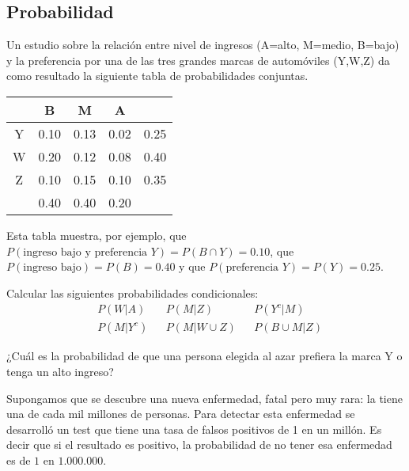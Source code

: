 \documentclass[a4paper,oneside,fleqn,11pt]{article}
\begin{document}
\maketitle

\begin{ejercicios}

\section{Probabilidad}

\item 
Un estudio sobre la relación entre nivel de ingresos (A=alto, M=medio, B=bajo) y
la preferencia por una de las tres grandes marcas de automóviles (Y,W,Z) da como
resultado la siguiente tabla de probabilidades conjuntas.

\begin{table}[h]
    \centering
    \begin{tabular}{c|ccc|c}
         & B & M & A \\
        \hline
        Y & 0.10 & 0.13 & 0.02 & 0.25 \\
        W & 0.20 & 0.12 & 0.08 & 0.40 \\
        Z & 0.10 & 0.15 & 0.10 & 0.35 \\
        \hline
         & 0.40 & 0.40 & 0.20 \\
    \end{tabular}
\end{table}

\noindent 
Esta tabla muestra, por ejemplo, que $P(\text{ingreso bajo y preferencia } Y) =
P(B \cap Y) = 0.10$, que $P(\text{ingreso bajo}) = P(B) = 0.40$ y que
$P(\text{preferencia } Y) = P(Y) = 0.25$.

\begin{ejitems}
  \item
  Calcular las siguientes probabilidades condicionales:
  \begin{align*}
    & P(W|A)
    && P(M|Z)
    && P(Y^c|M)
    \\
    & P(M|Y^c)
    && P(M|W \cup Z)
    && P(B \cup M|Z)
  \end{align*}
  
  \item
  ¿Cuál es la probabilidad de que una persona elegida al azar prefiera la marca Y
  o tenga un alto ingreso?
\end{ejitems}

\item
Supongamos que se descubre una nueva enfermedad, fatal pero muy rara: la tiene
una de cada mil millones de personas. Para detectar esta enfermedad se
desarrolló un test que tiene una tasa de falsos positivos de 1 en un millón.
Es decir que si el resultado es positivo, la probabilidad de no tener esa
enfermedad es de $1$ en $1.000.000$.


\end{ejercicios}
\end{document}
